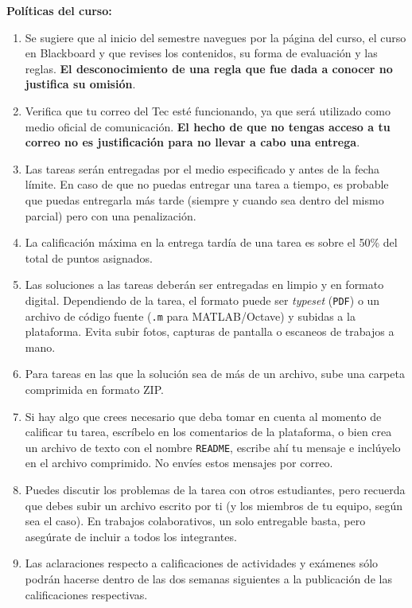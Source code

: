 \documentclass[12pt, letterpaper, oneside]{article}
\begin{document}
  \noindent\textbf{Políticas del curso:}  
  \begin{enumerate}
  \item Se sugiere que al inicio del semestre navegues por la página del curso, el curso en Blackboard y que revises los contenidos, su forma de evaluación y las reglas. \textbf{El desconocimiento de una regla que fue dada a conocer no justifica su omisión}.
  \item Verifica que tu correo del Tec esté funcionando, ya que será utilizado como medio oficial de comunicación. \textbf{El hecho de que no tengas acceso a tu correo no es justificación para no llevar a cabo una entrega}.
  \item Las tareas serán entregadas por el medio especificado y antes de la fecha límite. En caso de que no puedas entregar una tarea a tiempo, es probable que puedas entregarla más tarde (siempre y cuando sea dentro del mismo parcial) pero con una penalización.
  \item La calificación máxima en la entrega tardía de una tarea es sobre el 50\% del total de puntos asignados.
  \item Las soluciones a las tareas deberán ser entregadas en limpio y en formato digital. Dependiendo de la tarea, el formato puede ser \textit{typeset} (\texttt{PDF}) o un archivo de código fuente (\texttt{.m} para MATLAB/Octave) y subidas a la plataforma. Evita subir fotos, capturas de pantalla o escaneos de trabajos a mano.
  \item Para tareas en las que la solución sea de más de un archivo, sube una carpeta comprimida en formato ZIP.
  \item Si hay algo que crees necesario que deba tomar en cuenta al momento de calificar tu tarea, escríbelo en los comentarios de la plataforma, o bien crea un archivo de texto con el nombre \texttt{README}, escribe ahí tu mensaje e inclúyelo en el archivo comprimido. No envíes estos mensajes por correo.
  \item Puedes discutir los problemas de la tarea con otros estudiantes, pero recuerda que debes subir un archivo escrito por ti (y los miembros de tu equipo, según sea el caso). En trabajos colaborativos, un solo entregable basta, pero asegúrate de incluir a todos los integrantes.
  \item Las aclaraciones respecto a calificaciones de actividades y exámenes sólo podrán hacerse dentro de las dos semanas siguientes a la publicación de las calificaciones respectivas.

\end{enumerate}
\end{document}
